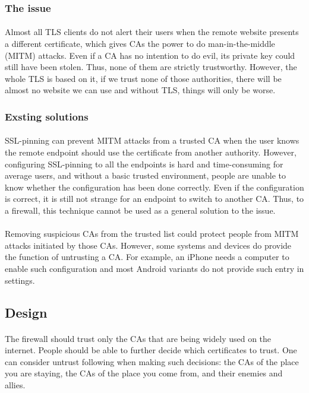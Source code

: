\documentclass[mscthesis]{usiinfthesis}
\begin{document}
\subsubsection{The issue}
\paragraph{}
Almost all TLS clients do not alert their users when the remote website presents a different certificate, which gives CAs the power to do man-in-the-middle (MITM) attacks. Even if a CA has no intention to do evil, its private key could still have been stolen. Thus, none of them are strictly trustworthy. However, the whole TLS is based on it, if we trust none of those authorities, there will be almost no website we can use and without TLS, things will only be worse.
\subsubsection{Exsting solutions}
\paragraph{}
SSL-pinning can prevent MITM attacks from a trusted CA when the user knows the remote endpoint should use the certificate from another authority. However, configuring SSL-pinning to all the endpoints is hard and time-consuming for average users, and without a basic trusted environment, people are unable to know whether the configuration has been done correctly. Even if the configuration is correct, it is still not strange for an endpoint to switch to another CA. Thus, to a firewall, this technique cannot be used as a general solution to the issue.
\paragraph{}
Removing suspicious CAs from the trusted list could protect people from MITM attacks initiated by those CAs. However, some systems and devices do provide the function of untrusting a CA. For example, an iPhone needs a computer to enable such configuration and most Android variants do not provide such entry in settings.
\subsection{Design}
\paragraph{}
The firewall should trust only the CAs that are being widely used on the internet. People should be able to further decide which certificates to trust. One can consider untrust following when making such decisions: the CAs of the place you are staying, the CAs of the place you come from, and their enemies and allies.
\end{document}
